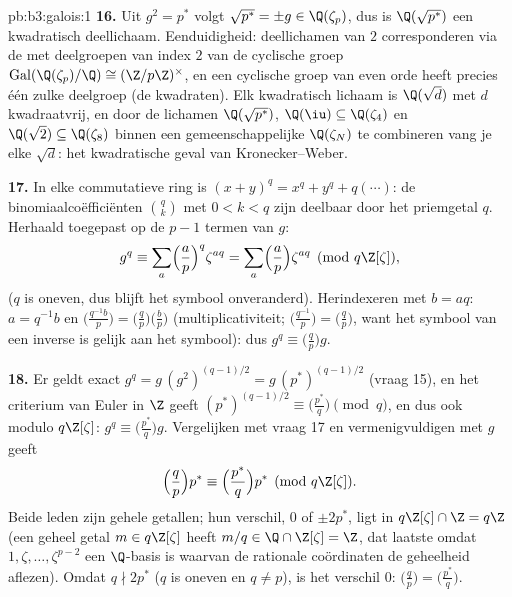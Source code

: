 \begin{solution}{pb:b3:galois:1}
\textbf{16.} Uit $g^2 = p^*$ volgt $\sqrt{p^*} = \pm g \in
\Q(\zeta_p)$, dus is $\Q(\sqrt{p^*})$ een kwadratisch
deellichaam. Eenduidigheid: deellichamen van  $2$
corresponderen via de  met deelgroepen van
index $2$ van de cyclische groep
$\operatorname{Gal}(\Q(\zeta_p)/\Q) \cong (\Z/p\Z)^\times$, en een
cyclische groep van even orde heeft precies één zulke deelgroep
(de kwadraten). Elk kwadratisch lichaam is $\Q(\sqrt{d})$ met $d$
kwadraatvrij, en door de lichamen $\Q(\sqrt{p^*})$, $\Q(\iu)
\subseteq \Q(\zeta_4)$ en $\Q(\sqrt2) \subseteq \Q(\zeta_8)$
binnen een gemeenschappelijke $\Q(\zeta_N)$ te combineren vang je
elke $\sqrt d$: het kwadratische geval van Kronecker--Weber.

\textbf{17.} In elke commutatieve ring is $(x + y)^q = x^q + y^q +
q(\cdots)$: de binomiaalcoëfficiënten $\binom qk$ met $0 < k < q$
zijn deelbaar door het priemgetal $q$. Herhaald toegepast op de $p
- 1$ termen van $g$:
\[
g^q \equiv \sum_{a}\Bigl(\frac ap\Bigr)^{q}\zeta^{aq}
= \sum_a\Bigl(\frac ap\Bigr)\zeta^{aq}
\pmod{q\Z[\zeta]},
\]
($q$ is oneven, dus blijft het symbool onveranderd). Herindexeren
met $b = aq$: $a = q^{-1}b$ en $\bigl(\frac{q^{-1}b}p\bigr) =
\bigl(\frac{q}p\bigr)\bigl(\frac bp\bigr)$ (multiplicativiteit;
$\bigl(\frac{q^{-1}}p\bigr) = \bigl(\frac qp\bigr)$, want het
symbool van een inverse is gelijk aan het symbool): dus $g^q
\equiv \bigl(\frac qp\bigr)g$.

\textbf{18.} Er geldt exact $g^q = g\,(g^2)^{(q-1)/2} =
g\,(p^*)^{(q-1)/2}$ (vraag 15), en het criterium van Euler in $\Z$
geeft $(p^*)^{(q-1)/2} \equiv \bigl(\frac{p^*}q\bigr) \pmod q$, en
dus ook modulo $q\Z[\zeta]$: $g^q \equiv
\bigl(\frac{p^*}q\bigr)g$. Vergelijken met vraag 17 en
vermenigvuldigen met $g$ geeft
\[
\Bigl(\frac qp\Bigr)p^* \equiv \Bigl(\frac{p^*}q\Bigr)p^*
\pmod{q\Z[\zeta]} .
\]
Beide leden zijn gehele getallen; hun verschil, $0$ of $\pm2p^*$,
ligt in $q\Z[\zeta] \cap \Z = q\Z$ (een geheel getal $m \in
q\Z[\zeta]$ heeft $m/q \in \Q \cap \Z[\zeta] = \Z$, dat laatste
omdat $1, \zeta, \dots, \zeta^{p-2}$ een $\Q$-basis is waarvan de
rationale coördinaten de geheelheid aflezen). Omdat $q \nmid 2p^*$
($q$ is oneven en $q \neq p$), is het verschil $0$:
$\bigl(\frac qp\bigr) = \bigl(\frac{p^*}q\bigr)$.


\end{solution}
